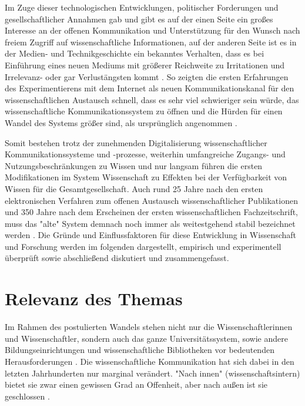 Im Zuge dieser technologischen Entwicklungen, politischer Forderungen und gesellschaftlicher Annahmen gab und gibt es auf der einen Seite ein großes Interesse an der offenen Kommunikation und Unterstützung für den Wunsch nach freiem Zugriff auf wissenschaftliche Informationen, auf der anderen Seite ist es in der Medien- und Technikgeschichte ein bekanntes Verhalten, dass es bei Einführung eines neuen Mediums mit größerer Reichweite zu Irritationen \cite{naeder_2010_open} und Irrelevanz- oder gar Verlustängsten kommt \cite{hagner_2015_sache_buches}. So zeigten die ersten Erfahrungen des Experimentierens mit dem Internet als neuen Kommunikationskanal für den wissenschaftlichen Austausch schnell, dass es sehr viel schwieriger sein würde, das wissenschaftliche Kommunikationssystem zu öffnen und die Hürden für einen Wandel des Systems größer sind, als ursprünglich angenommen \cite{bjork_2004_open}.

Somit bestehen trotz der zunehmenden Digitalisierung wissenschaftlicher Kommunikationssysteme und -prozesse, weiterhin umfangreiche Zugangs- und Nutzungsbeschränkungen zu Wissen und nur langsam führen die ersten Modifikationen im System Wissenschaft zu Effekten bei der Verfügbarkeit von Wissen für die Gesamtgesellschaft. Auch rund 25 Jahre nach den ersten elektronischen Verfahren zum offenen Austausch wissenschaftlicher Publikationen und 350 Jahre nach dem Erscheinen der ersten wissenschaftlichen Fachzeitschrift, muss das "alte" System demnach noch immer als weitestgehend stabil bezeichnet werden \cite{brembs2015open} \cite{Hanekop_2014} \cite{Warnke_2012}. Die Gründe und Einflussfaktoren für diese Entwicklung in Wissenschaft und Forschung werden im folgenden dargestellt, empirisch und experimentell überprüft sowie abschließend diskutiert und zusammengefasst.

\section{Relevanz des Themas}

Im Rahmen des postulierten Wandels stehen nicht nur die Wissenschaftlerinnen und Wissenschaftler, sondern auch das ganze Universitätssystem, sowie andere Bildungseinrichtungen und wissenschaftliche Bibliotheken vor bedeutenden Herausforderungen \cite{muller_2010_open} \cite{Harter2006} \cite{Gu_don_2004} \cite{osterloh2008anreize} \cite{Beverungen_2014}. Die wissenschaftliche Kommunikation hat sich dabei in den letzten Jahrhunderten nur marginal verändert. "Nach innen" (wissenschaftsintern) bietet sie zwar einen gewissen Grad an Offenheit, aber nach außen ist sie geschlossen \cite{kelty_2004}.

